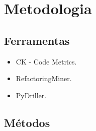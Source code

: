 
\chapter{Metodologia}\label{cap:Metodologia}

\section{Ferramentas}\label{sec:ferramentas}

\begin{itemize}
    \item CK - Code Metrics.
    \item RefactoringMiner.
    \item PyDriller.
\end{itemize}

\section{Métodos}\label{sec:metodo}
